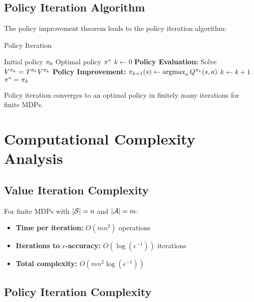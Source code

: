 \subsection{Policy Iteration Algorithm}

The policy improvement theorem leads to the policy iteration algorithm:

\begin{algorithm}
\caption{Policy Iteration}
\begin{algorithmic}
\REQUIRE Initial policy $\pi_0$
\ENSURE Optimal policy $\pi^*$
\STATE $k \leftarrow 0$
\REPEAT
\STATE \textbf{Policy Evaluation:} Solve $V^{\pi_k} = T^{\pi_k} V^{\pi_k}$
\STATE \textbf{Policy Improvement:} $\pi_{k+1}(s) \leftarrow \operatorname*{argmax}_a Q^{\pi_k}(s,a)$
\STATE $k \leftarrow k + 1$
\RETURN $\pi^* = \pi_k$
\end{algorithmic}
\end{algorithm}

\begin{theorem}
Policy iteration converges to an optimal policy in finitely many iterations for finite MDPs.
\end{theorem}

\section{Computational Complexity Analysis}

\subsection{Value Iteration Complexity}

For finite MDPs with $|\mathcal{S}| = n$ and $|\mathcal{A}| = m$:

\begin{itemize}
    \item \textbf{Time per iteration:} $O(mn^2)$ operations
    \item \textbf{Iterations to $\epsilon$-accuracy:} $O(\log(\epsilon^{-1}))$ iterations
    \item \textbf{Total complexity:} $O(mn^2 \log(\epsilon^{-1}))$
\end{itemize}

\subsection{Policy Iteration Complexity}


